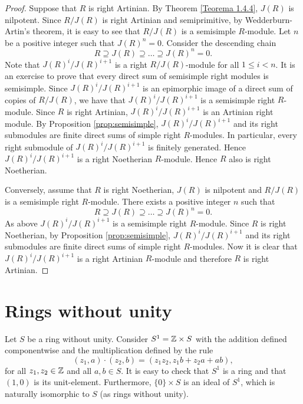 \begin{proof}
Suppose that $R$ is right Artinian. By Theorem \ref{Teorema 1.4.4}, $J(R)$ is nilpotent. Since $R/J(R)$ is right Artinian and semiprimitive, by Wedderburn-Artin's theorem, it is easy to see that  $R/J(R)$ is a semisimple $R$-module. Let $n$ be a positive integer such that $J(R)^n=0$. Consider the descending chain
\[ R\supseteq J(R)\supseteq \dots\supseteq J(R)^n=0.\]
Note that $J(R)^{i}/J(R)^{i+1}$ is a right $R/J(R)$-module for all $1\leq i<n$. It is an exercise to prove that every direct sum of semisimple right modules is semisimple. Since $J(R)^{i}/J(R)^{i+1}$ is an epimorphic image of a direct sum of copies of $R/J(R)$, we have that $J(R)^{i}/J(R)^{i+1}$ is a semisimple right $R$-module. Since $R$ is right Artinian, $J(R)^{i}/J(R)^{i+1}$ is an Artinian right module. By Proposition \ref{prop:semisimple},  $J(R)^{i}/J(R)^{i+1}$ and its right submodules are finite direct sums of simple right $R$-modules. In particular, every right submodule of $J(R)^{i}/J(R)^{i+1}$ is finitely generated. Hence $J(R)^{i}/J(R)^{i+1}$ is a right Noetherian $R$-module. Hence $R$ also is right Noetherian. 

Conversely, assume that $R$ is right Noetherian, $J(R)$ is nilpotent and $R/J(R)$ is a semisimple right $R$-module. There exists a positive integer $n$ such that 
\[ R\supseteq J(R)\supseteq \dots\supseteq J(R)^n=0.\]
As above $J(R)^{i}/J(R)^{i+1}$ is a semisimple right $R$-module. Since $R$ is right Noetherian, by Proposition \ref{prop:semisimple}, $J(R)^{i}/J(R)^{i+1}$ and its right submodules are finite direct sums of simple right $R$-modules. Now it is clear that $J(R)^{i}/J(R)^{i+1}$ is a right Artinian $R$-module and therefore $R$ is right Artinian.
\end{proof}

\section{Rings without unity}

Let $S$ be a ring without unity. Consider $S^1=\mathbb{Z}\times S$ with the addition defined componentwise and the multiplication defined by
the rule
$$(z_1,a)\cdot (z_2,b)=(z_1z_2,z_1b+z_2a+ab),
$$
for all $z_1,z_2\in\mathbb{Z}$ and all $a,b\in S$. It is easy to check that $S^1$ is a ring and that $(1,0)$ is its unit-element. Furthermore, 
$\{0\}\times S$ is an ideal of $S^1$, which is naturally isomorphic to $S$ (as rings without unity).

